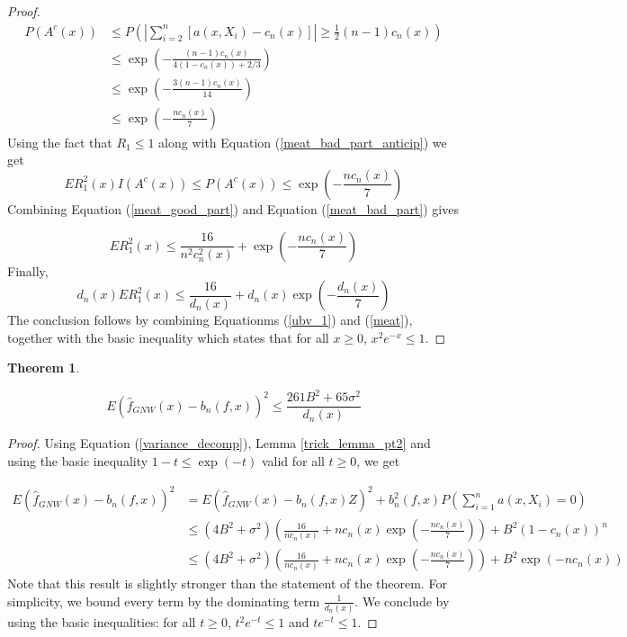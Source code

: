 \documentclass{article}
\newtheorem{theorem}{Theorem}[section]
\begin{document}
\begin{proof}
\begin{equation}
\label{meat_bad_part_anticip}
\begin{split}
    P(A^c(x))&\leq P(|\sum_{i=2}^{n}[a(x,X_i)-c_n(x)]|\geq \frac{1}{2}(n-1)c_n(x))\\
    &\leq \exp(-\frac{(n-1)c_n(x)}{4(1-c_n(x))+2/3})\\
    &\leq \exp(-\frac{3(n-1)c_n(x)}{14})\\
    &\leq \exp(-\frac{nc_n(x)}{7})
\end{split}
\end{equation}
Using the fact that $R_1\leq 1$ along with Equation (\ref{meat_bad_part_anticip}) we get
\begin{equation}
\label{meat_bad_part}
    ER^2_1(x)I(A^c(x))\leq P(A^c(x))\leq \exp(-\frac{nc_n(x)}{7})
\end{equation}
Combining Equation (\ref{meat_good_part}) and Equation (\ref{meat_bad_part}) gives

\begin{equation}
\label{meat}
ER^2_1(x)\leq \frac{16}{n^2c_n^2(x)}+\exp(-\frac{nc_n(x)}{7})
\end{equation}
Finally,
\begin{equation}
    d_n(x)ER^2_1(x)\leq \frac{16}{d_n(x)}+d_n(x)\exp(-\frac{d_n(x)}{7})
\end{equation}
The conclusion follows by combining Equationms (\ref{ubv_1}) and  (\ref{meat}), together with the basic inequality which states that for all $x\geq 0$, $x^2e^{-x}\leq 1$.
\end{proof}

\begin{theorem}
\label{variance_lemma}

\begin{equation*}
    E(\hat{f}_{GNW}(x)-b_n(f,x))^2\leq\frac{261B^2+65\sigma^2}{d_n(x)}
\end{equation*}
\end{theorem}

\begin{proof}

Using Equation (\ref{variance_decomp}),
Lemma \ref{trick_lemma_pt2} and using the basic inequality $1-t\leq \exp{(-t)}$ valid for all $t\geq 0$, we get

\begin{equation*}
\begin{split}
    E(\hat{f}_{GNW}(x)-b_n(f,x))^2
    &=E(\hat{f}_{GNW}(x)-b_n(f,x)Z)^2+b_n^2(f,x)P(\sum_{i=1}^n a(x,X_i)=0)\\
    &\leq (4B^2+\sigma^2)(\frac{16}{nc_n(x)}+nc_n(x)\exp{(-\frac{nc_n(x)}{7})})+B^2(1-c_n(x))^n\\
    &\leq (4B^2+\sigma^2)(\frac{16}{nc_n(x)}+nc_n(x)\exp{(-\frac{nc_n(x)}{7})})+B^2\exp(-nc_n(x))
\end{split}
\end{equation*}
Note that this result is slightly stronger than the statement of the theorem. For simplicity, we bound every term by the dominating term $\frac{1}{d_n(x)}$.
We conclude by using the basic inequalities:
for all $t\geq 0$, $t^2e^{-t}\leq 1$ and $te^{-t}\leq 1$.
\end{proof}
\end{document}
